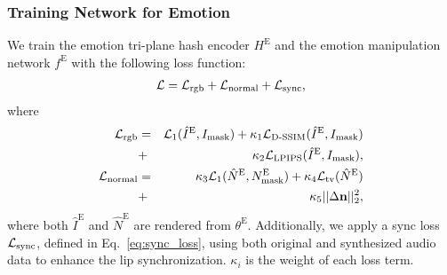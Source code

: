 \subsubsection{Training Network for Emotion}
We train the emotion tri-plane hash encoder $H^\text{E}$ and the emotion manipulation network $f^\text{E}$ with the following loss function:
\begin{eqnarray}
    \mathcal{L} = \mathcal{L}_\text{rgb} + \mathcal{L}_\text{normal} + \mathcal{L}_\text{sync},
\end{eqnarray}
where
\begin{eqnarray}
    \mathcal{L}_\text{rgb} &=& \mathcal{L}_1 (\hat{I}^\text{E}, I_\text{mask}) + \kappa_1 \mathcal{L}_\text{D-SSIM} (\hat{I}^\text{E}, I_\text{mask}) \nonumber \\
    &+& \kappa_2 \mathcal{L}_\text{LPIPS}(\hat{I}^\text{E}, I_\text{mask}), \\
    \mathcal{L}_\text{normal} &=& \kappa_3 \mathcal{L}_1 (\hat{N}^\text{E}, N^\text{E}_\text{mask}) + \kappa_4 \mathcal{L}_\text{tv}(\hat{N}^\text{E}) \nonumber\\ 
    &+& \kappa_5 || \Delta \mathbf{n} ||^2_2,
\end{eqnarray}
where both $\hat{I}^\text{E}$ and $\hat{N}^\text{E}$ are rendered from $\theta^\text{E}$. Additionally, we apply a sync loss $\mathcal{L}_\text{sync}$, defined in Eq.~\ref{eq:sync_loss}, using both original and synthesized audio data to enhance the lip synchronization. $\kappa_i$ is the weight of each loss term. 





